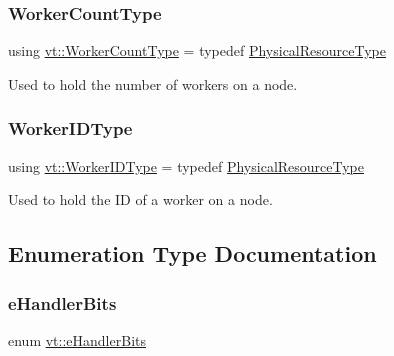 \subsubsection{\texorpdfstring{Worker\+Count\+Type}{WorkerCountType}}
{\footnotesize\ttfamily using \hyperlink{namespacevt_aa93398ea48f2cb6c188512250f7cc248}{vt\+::\+Worker\+Count\+Type} = typedef \hyperlink{namespacevt_a2dc36fcada816dc6d11774d650328ee9}{Physical\+Resource\+Type}}



Used to hold the number of workers on a node. 

\mbox{\label{namespacevt_a656e362091da17b9b93d0655b36e3392}} 
\subsubsection{\texorpdfstring{Worker\+I\+D\+Type}{WorkerIDType}}
{\footnotesize\ttfamily using \hyperlink{namespacevt_a656e362091da17b9b93d0655b36e3392}{vt\+::\+Worker\+I\+D\+Type} = typedef \hyperlink{namespacevt_a2dc36fcada816dc6d11774d650328ee9}{Physical\+Resource\+Type}}



Used to hold the ID of a worker on a node. 



\subsection{Enumeration Type Documentation}
\mbox{\label{namespacevt_af182285b57b225b163d5d8aff03cb8c2}} 
\subsubsection{\texorpdfstring{e\+Handler\+Bits}{eHandlerBits}}
{\footnotesize\ttfamily enum \hyperlink{namespacevt_af182285b57b225b163d5d8aff03cb8c2}{vt\+::e\+Handler\+Bits}}


